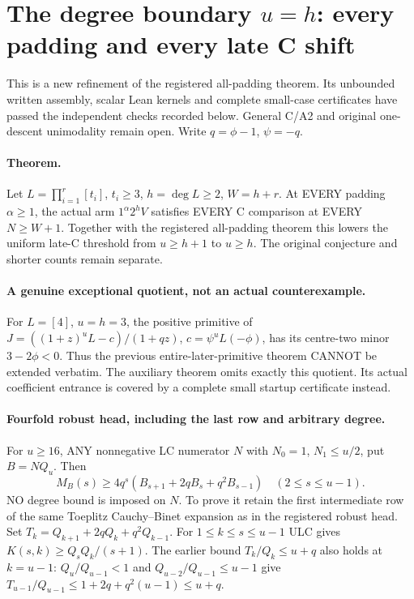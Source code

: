 \section{The degree boundary $u=h$: every padding and every late C shift}
This is a new refinement of the registered all-padding theorem. Its
unbounded written assembly, scalar Lean kernels and complete small-case
certificates have passed the independent checks recorded below. General
C/A2 and original one-descent unimodality remain open. Write $q=\phi-1$, $\psi=-q$.

\paragraph{Theorem.}
Let $L=\prod_{i=1}^r[t_i]$, $t_i\ge3$, $h=\deg L\ge2$,
$W=h+r$. At EVERY padding $\alpha\ge1$, the actual arm
$1^\alpha2^hV$ satisfies EVERY C comparison at EVERY $N\ge W+1$.
Together with the registered all-padding theorem this lowers
the uniform late-C threshold from $u\ge h+1$ to $u\ge h$.
The original conjecture and shorter counts remain separate.

\paragraph{A genuine exceptional quotient, not an actual counterexample.}
For $L=[4]$, $u=h=3$, the positive primitive of
$J=((1+z)^uL-c)/(1+qz)$, $c=\psi^uL(-\phi)$, has its centre-two
minor $3-2\phi<0$. Thus the previous entire-later-primitive theorem
CANNOT be extended verbatim. The auxiliary theorem
omits exactly this quotient. Its actual coefficient entrance is
covered by a complete small startup certificate instead.

\paragraph{Fourfold robust head, including the last row and arbitrary degree.}
For $u\ge16$, ANY nonnegative LC numerator $N$ with $N_0=1$,
$N_1\le u/2$, put $B=NQ_u$. Then
\[
 M_B(s)\ge4q^s(B_{s+1}+2qB_s+q^2B_{s-1})
                         \quad(2\le s\le u-1).       \tag{1}
\]
NO degree bound is imposed on $N$. To prove it retain the first
intermediate row of the same Toeplitz Cauchy--Binet expansion as
in the registered robust head. Set $T_k=Q_{k+1}+2qQ_k+q^2Q_{k-1}$.
For $1\le k\le s\le u-1$ ULC gives
$K(s,k)\ge Q_sQ_k/(s+1)$. The earlier bound $T_k/Q_k\le u+q$
also holds at $k=u-1$: $Q_u/Q_{u-1}<1$ and
$Q_{u-2}/Q_{u-1}\le u-1$ give
$T_{u-1}/Q_{u-1}\le1+2q+q^2(u-1)\le u+q$.

